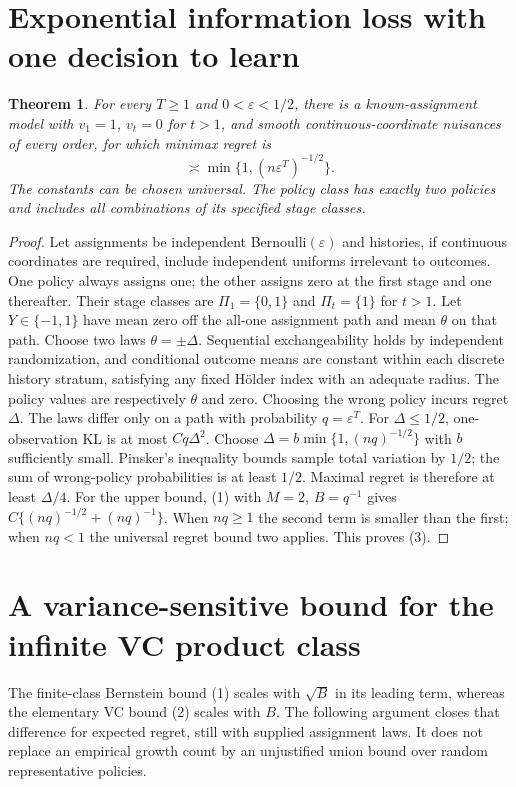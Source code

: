 \documentclass[11pt]{article}
\newtheorem{theorem}{Theorem}
\theoremstyle{definition}
\begin{document}
\section*{Exponential information loss with one decision to learn}
\begin{theorem}
For every $T\ge1$ and $0<\varepsilon<1/2$, there is a known-assignment
model with $v_1=1$, $v_t=0$ for $t>1$, and smooth continuous-coordinate
nuisances of every order, for which minimax regret is
\[
 \asymp\min\{1,(n\varepsilon^T)^{-1/2}\}.               \tag{3}
\]
The constants can be chosen universal. The policy class has exactly two
policies and includes all combinations of its specified stage classes.
\end{theorem}
\begin{proof}
Let assignments be independent Bernoulli$(\varepsilon)$ and histories,
if continuous coordinates are required, include independent uniforms
irrelevant to outcomes. One policy always assigns one; the other assigns
zero at the first stage and one thereafter. Their stage classes are
$\Pi_1=\{0,1\}$ and $\Pi_t=\{1\}$ for $t>1$.
Let $Y\in\{-1,1\}$ have mean zero off the all-one assignment path and
mean $\theta$ on that path. Choose two laws $\theta=\pm\Delta$.
Sequential exchangeability holds by independent randomization, and
conditional outcome means are constant within each discrete history
stratum, satisfying any fixed H\"older index with an adequate radius.
The policy values are respectively $\theta$ and zero. Choosing the wrong
policy incurs regret $\Delta$.
The laws differ only on a path with probability $q=\varepsilon^T$.
For $\Delta\le1/2$, one-observation KL is at most $Cq\Delta^2$.
Choose $\Delta=b\min\{1,(nq)^{-1/2}\}$ with $b$ sufficiently small.
Pinsker's inequality bounds sample total variation by $1/2$; the sum of
wrong-policy probabilities is at least $1/2$. Maximal regret is therefore
at least $\Delta/4$.
For the upper bound, (1) with $M=2$, $B=q^{-1}$ gives
$C\{(nq)^{-1/2}+(nq)^{-1}\}$. When $nq\ge1$ the second term is smaller
than the first; when $nq<1$ the universal regret bound two applies.
This proves (3).
\end{proof}

\section*{A variance-sensitive bound for the infinite VC product class}
The finite-class Bernstein bound (1) scales with $\sqrt B$ in its leading
term, whereas the elementary VC bound (2) scales with $B$. The following
argument closes that difference for expected regret, still with supplied
assignment laws. It does not replace an empirical growth count by an
unjustified union bound over random representative policies.
\end{document}

